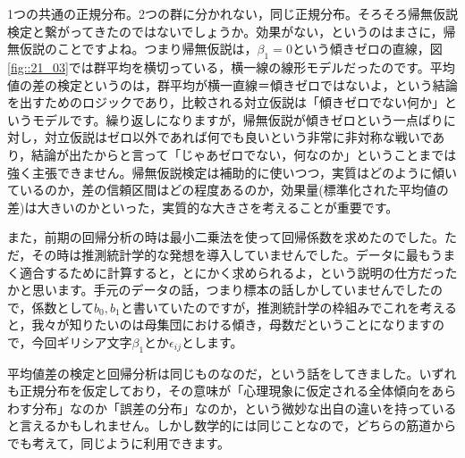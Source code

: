 \documentclass{ltjsarticle}
\begin{document}



1つの共通の正規分布。2つの群に分かれない，同じ正規分布。そろそろ帰無仮説検定と繋がってきたのではないでしょうか。効果がない，というのはまさに，帰無仮説のことですよね。つまり帰無仮説は，$\beta_1=0$という傾きゼロの直線，図\ref{fig::21_03}では群平均を横切っている，横一線の線形モデルだったのです。平均値の差の検定というのは，群平均が横一直線＝傾きゼロではないよ，という結論を出すためのロジックであり，比較される対立仮説は「傾きゼロでない何か」というモデルです。繰り返しになりますが，帰無仮説が傾きゼロという一点ばりに対し，対立仮説はゼロ以外であれば何でも良いという非常に非対称な戦いであり，結論が出たからと言って「じゃあゼロでない，何なのか」ということまでは強く主張できません。帰無仮説検定は補助的に使いつつ，実質はどのように傾いているのか，差の信頼区間はどの程度あるのか，効果量(標準化された平均値の差)は大きいのかといった，実質的な大きさを考えることが重要です。

また，前期の回帰分析の時は最小二乗法を使って回帰係数を求めたのでした。ただ，その時は推測統計学的な発想を導入していませんでした。データに最もうまく適合するために計算すると，とにかく求められるよ，という説明の仕方だったかと思います。手元のデータの話，つまり標本の話しかしていませんでしたので，係数として$b_0,b_1$と書いていたのですが，推測統計学の枠組みでこれを考えると，我々が知りたいのは母集団における傾き，母数だということになりますので，今回ギリシア文字$\beta_1$とか$\epsilon_{ij}$とします。

平均値差の検定と回帰分析は同じものなのだ，という話をしてきました。いずれも正規分布を仮定しており，その意味が「心理現象に仮定される全体傾向をあらわす分布」なのか「誤差の分布」なのか，という微妙な出自の違いを持っていると言えるかもしれません。しかし数学的には同じことなので，どちらの筋道からでも考えて，同じように利用できます。
\end{document}
